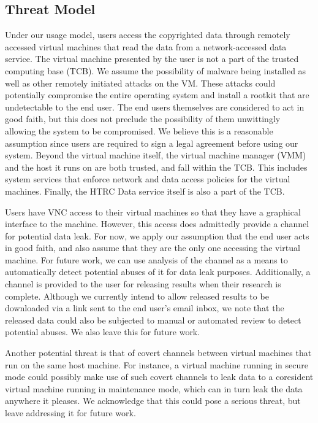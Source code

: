 \documentclass{acm_proc_article-sp}
\begin{document}
\subsection{Threat Model}

Under our usage model, users access the copyrighted data through remotely
accessed virtual machines that read the data from a network-accessed data
service.  The virtual machine presented by the user is not a part of the trusted
computing base (TCB).  We assume the possibility of malware being installed as
well as other remotely initiated attacks on the VM.  These attacks could
potentially compromise the entire operating system and install a rootkit that
are undetectable to the end user.  The end users themselves are considered to
act in good faith, but this does not preclude the possibility of them
unwittingly allowing the system to be compromised.  We believe this is a
reasonable assumption since users are required to sign a legal agreement before
using our system.  Beyond the virtual machine itself, the virtual machine
manager (VMM) and the host it runs on are both trusted, and fall within the TCB.
This includes system services that enforce network and data access policies for
the virtual machines.  Finally, the HTRC Data service itself is also a part of
the TCB.

Users have VNC access to their virtual machines so that they have a graphical
interface to the machine.  However, this access does admittedly provide a
channel for potential data leak.  For now, we apply our assumption that the end
user acts in good faith, and also assume that they are the only one accessing
the virtual machine.  For future work, we can use analysis of the channel as a
means to automatically detect potential abuses of it for data leak purposes.
Additionally, a channel is provided to the user for releasing results when their
research is complete.  Although we currently intend to allow released results to
be downloaded via a link sent to the end user's email inbox, we note that the
released data could also be subjected to manual or automated review to detect
potential abuses.  We also leave this for future work.

Another potential threat is that of covert channels between virtual machines
that run on the same host machine.  For instance, a virtual machine running in
secure mode could possibly make use of such covert channels to leak data to a
coresident virtual machine running in maintenance mode, which can in turn leak
the data anywhere it pleases.  We acknowledge that this could pose a serious
threat, but leave addressing it for future work.
\end{document}
